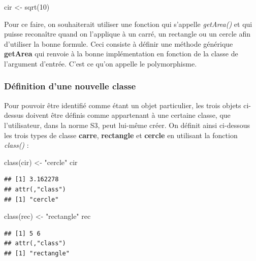 \documentclass[
]{book}
\newenvironment{Shaded}{\begin{snugshade}}{\end{snugshade}}
\newcommand{\DecValTok}[1]{\textcolor[rgb]{0.00,0.00,0.81}{#1}}
\newcommand{\FunctionTok}[1]{\textcolor[rgb]{0.00,0.00,0.00}{#1}}
\newcommand{\NormalTok}[1]{#1}
\newcommand{\OtherTok}[1]{\textcolor[rgb]{0.56,0.35,0.01}{#1}}
\newcommand{\StringTok}[1]{\textcolor[rgb]{0.31,0.60,0.02}{#1}}
\theoremstyle{definition}
\theoremstyle{definition}
\theoremstyle{definition}
\theoremstyle{definition}
\theoremstyle{remark}
\begin{document}
\begin{Shaded}
\begin{Highlighting}[]
\NormalTok{cir }\OtherTok{\textless{}{-}} \FunctionTok{sqrt}\NormalTok{(}\DecValTok{10}\NormalTok{)}
\end{Highlighting}
\end{Shaded}

Pour ce faire, on souhaiterait utiliser une fonction qui s'appelle \emph{getArea()} et qui puisse reconaître quand on l'applique à un carré, un rectangle ou un cercle afin d'utiliser la bonne formule. Ceci consiste à définir une méthode générique \textbf{getArea} qui renvoie à la bonne implémentation en fonction de la classe de l'argument d'entrée. C'est ce qu'on appelle le polymorphisme.

\hypertarget{duxe9finition-dune-nouvelle-classe}{%
\subsubsection{Définition d'une nouvelle classe}\label{duxe9finition-dune-nouvelle-classe}}

Pour pouvoir être identifié comme étant un objet particulier, les trois objets ci-dessus doivent être définis comme appartenant à une certaine classe, que l'utilisateur, dans la norme S3, peut lui-même créer. On définit ainsi ci-dessous les trois types de classe \textbf{carre}, \textbf{rectangle} et \textbf{cercle} en utilisant la fonction \emph{class()} :

\begin{Shaded}
\begin{Highlighting}[]
\FunctionTok{class}\NormalTok{(cir) }\OtherTok{\textless{}{-}} \StringTok{"cercle"}
\NormalTok{cir}
\end{Highlighting}
\end{Shaded}

\begin{verbatim}
## [1] 3.162278
## attr(,"class")
## [1] "cercle"
\end{verbatim}

\begin{Shaded}
\begin{Highlighting}[]
\FunctionTok{class}\NormalTok{(rec) }\OtherTok{\textless{}{-}} \StringTok{"rectangle"}
\NormalTok{rec}
\end{Highlighting}
\end{Shaded}

\begin{verbatim}
## [1] 5 6
## attr(,"class")
## [1] "rectangle"
\end{verbatim}
\end{document}
